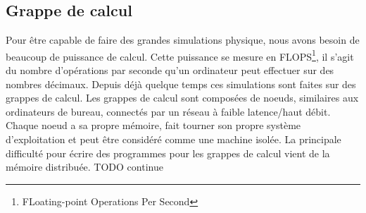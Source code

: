 \subsection{Grappe de calcul}
Pour être capable de faire des grandes simulations physique, nous avons besoin de beaucoup de puissance de calcul.
%
Cette puissance se mesure en FLOPS\footnote{FLoating-point Operations Per Second}, il s'agit du nombre d'opérations par seconde qu'un ordinateur peut effectuer sur des nombres décimaux.
%
Depuis déjà quelque temps ces simulations sont faites sur des grappes de calcul.
%
Les grappes de calcul sont composées de noeuds, similaires aux ordinateurs de bureau, connectés par un réseau à faible latence/haut débit.
%
Chaque noeud a sa propre mémoire, fait tourner son propre système d'exploitation et peut être considéré comme une machine isolée.
%
La principale difficulté pour écrire des programmes pour les grappes de calcul vient de la mémoire distribuée. TODO continue
